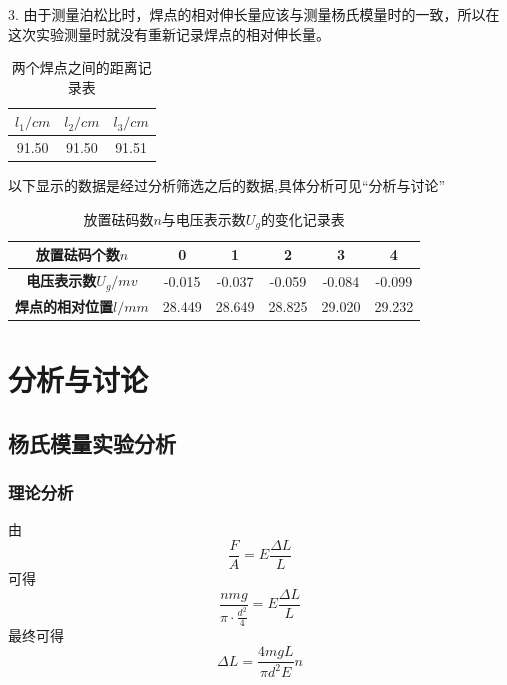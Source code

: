 \documentclass[a4paper,UTF8]{ctexart}
\begin{document}
3. 由于测量泊松比时，焊点的相对伸长量应该与测量杨氏模量时的一致，所以在这次实验测量时就没有重新记录焊点的相对伸长量。

\begin{table}[!hp]
    \begin{center}
    \begin{tabular}{|c|c|c|}
    \hline
    $l_1/cm$ & $l_2/cm$ & $l_3/cm$ \\
    \hline
    91.50 & 91.50 & 91.51 \\
    \hline
    \end{tabular}
    \end{center}
    \caption{两个焊点之间的距离记录表}
\end{table}

以下显示的数据是经过分析筛选之后的数据,具体分析可见“分析与讨论”

\begin{table}[!hp]
    \begin{center}
    \begin{tabular}{|c|c|c|c|c|c|}
    \hline
    \bfseries 放置砝码个数$n$ & 0 & 1 & 2 & 3 & 4 \\
    \hline
    \bfseries 电压表示数$U_g/mv$ & -0.015 & -0.037 & -0.059 & -0.084 & -0.099 \\
    \hline
    \bfseries 焊点的相对位置$l/mm$ & 28.449 & 28.649 & 28.825 & 29.020 & 29.232 \\
    \hline
    \end{tabular}
    \end{center}
    \caption{放置砝码数$n$与电压表示数$U_g$的变化记录表}
\end{table}

\section{分析与讨论}

\subsection{杨氏模量实验分析}

\subsubsection{理论分析}
由
\begin{equation*}
    \frac{F}{A} = E \frac{\Delta L}{L}
\end{equation*}
可得
\begin{equation*}
    \frac{nmg}{\pi \cdot \frac{d^2}{4}} = E \frac{\Delta L}{L}
\end{equation*}
最终可得
\begin{equation}
    \Delta L = \frac{4mgL}{\pi d^2 E} n
\end{equation}
\end{document}
